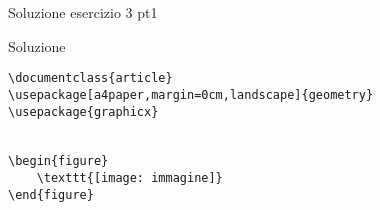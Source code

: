 \begin{frame}[fragile]{Soluzione esercizio 3 pt1}

\begin{soluzione}{Soluzione}
\begin{code}
\begin{verbatim}
\documentclass{article}
\usepackage[a4paper,margin=0cm,landscape]{geometry}
\usepackage{graphicx}


\begin{figure}
	\texttt{[image: immagine]}
\end{figure}


\end{verbatim}
\end{code}
\end{soluzione}

\end{frame}

